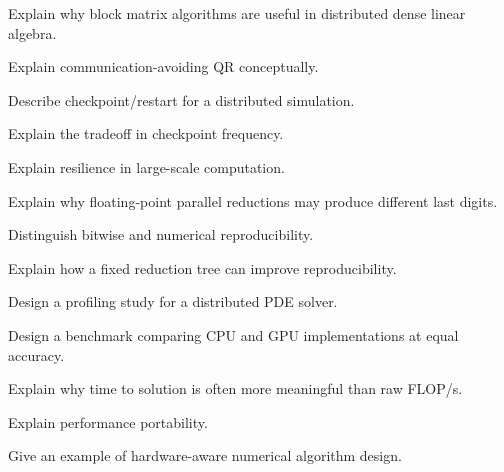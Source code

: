 \begin{exercise}[3]
Explain why block matrix algorithms are useful in distributed dense linear
algebra.
\end{exercise}

\begin{exercise}[3]
Explain communication-avoiding QR conceptually.
\end{exercise}

\begin{exercise}[3]
Describe checkpoint/restart for a distributed simulation.
\end{exercise}

\begin{exercise}[3]
Explain the tradeoff in checkpoint frequency.
\end{exercise}

\begin{exercise}[3]
Explain resilience in large-scale computation.
\end{exercise}

\begin{exercise}[3]
Explain why floating-point parallel reductions may produce different last
digits.
\end{exercise}

\begin{exercise}[3]
Distinguish bitwise and numerical reproducibility.
\end{exercise}

\begin{exercise}[3]
Explain how a fixed reduction tree can improve reproducibility.
\end{exercise}

\begin{exercise}[3]
Design a profiling study for a distributed PDE solver.
\end{exercise}

\begin{exercise}[3]
Design a benchmark comparing CPU and GPU implementations at equal
accuracy.
\end{exercise}

\begin{exercise}[3]
Explain why time to solution is often more meaningful than raw FLOP/s.
\end{exercise}

\begin{exercise}[3]
Explain performance portability.
\end{exercise}

\begin{exercise}[3]
Give an example of hardware-aware numerical algorithm design.
\end{exercise}

